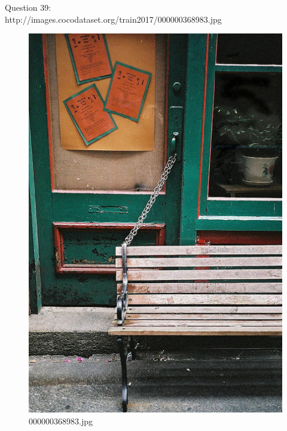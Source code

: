     Question 39:\\http://images.cocodataset.org/train2017/000000368983.jpg
    \begin{figure}[h]
        \centering
        \includegraphics[width=0.8\linewidth]{../image set/easy/000000368983.jpg}
        \caption{000000368983.jpg}
    \end{figure}
